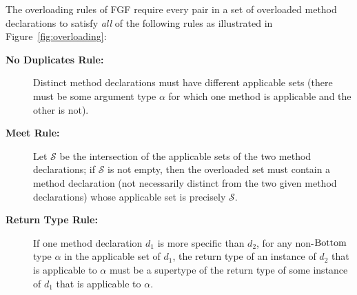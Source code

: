 The overloading rules of FGF require every pair in a set of
overloaded method declarations to satisfy \emph{all} of the following
rules as illustrated in Figure~\ref{fig:overloading}:
\begin{description}
\item[\textbf{No Duplicates Rule:}]
Distinct method declarations
must have different applicable sets
(there must be some argument type $\alpha$ for which one method is applicable and the other is not).

\item[\textbf{Meet Rule:}] Let $\mathcal{S}$ be the intersection of the applicable sets of the two method declarations;
if $\mathcal{S}$ is not empty, then the overloaded set must contain a method declaration
(not necessarily distinct from the two given method declarations) whose applicable set is precisely $\mathcal{S}$.

\item[\textbf{Return Type Rule:}] If one method declaration $d_1$ is
more specific than $d_2$, for any non-$\mathord{\mathrm{Bottom}}$ type $\alpha$ in the
applicable set of $d_1$, the return type of an instance of $d_2$ that is
applicable to $\alpha$ must be a supertype of the return type of
some instance of $d_1$ that is applicable to $\alpha$.
\end{description}

